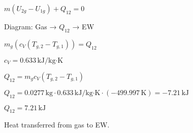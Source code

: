 \( m (U_{2g} - U_{1g}) + Q_{12} = 0 \)  

Diagram:  
Gas → \( Q_{12} \) → EW  

\( m_g (c_V (T_{g,2} - T_{g,1})) = Q_{12} \)  

\( c_V = 0.633 \, \text{kJ/kg·K} \)  

\( Q_{12} = m_g c_V (T_{g,2} - T_{g,1}) \)  

\( Q_{12} = 0.0277 \, \text{kg} \cdot 0.633 \, \text{kJ/kg·K} \cdot (-499.997 \, \text{K}) = -7.21 \, \text{kJ} \)  

\( Q_{12} = 7.21 \, \text{kJ} \)  

Heat transferred from gas to EW.